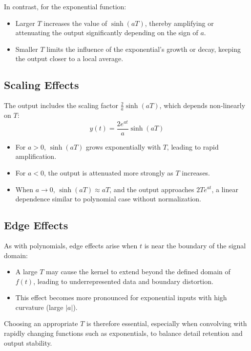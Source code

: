 \documentclass[12pt,a4paper]{report}
\begin{document}
In contrast, for the exponential function:
\begin{itemize}
    \item Larger \( T \) increases the value of \( \sinh(aT) \), thereby amplifying or attenuating the output significantly depending on the sign of \( a \).
    \item Smaller \( T \) limits the influence of the exponential's growth or decay, keeping the output closer to a local average.
\end{itemize}

\subsection{Scaling Effects}

The output includes the scaling factor \( \frac{2}{a} \sinh(aT) \), which depends non-linearly on \( T \):
\[
y(t) = \frac{2e^{at}}{a} \sinh(aT)
\]

\begin{itemize}
    \item For \( a > 0 \), \( \sinh(aT) \) grows exponentially with \( T \), leading to rapid amplification.
    \item For \( a < 0 \), the output is attenuated more strongly as \( T \) increases.
    \item When \( a \to 0 \), \( \sinh(aT) \approx aT \), and the output approaches \( 2Te^{at} \), a linear dependence similar to polynomial case without normalization.
\end{itemize}

\subsection{Edge Effects}

As with polynomials, edge effects arise when \( t \) is near the boundary of the signal domain:
\begin{itemize}
    \item A large \( T \) may cause the kernel to extend beyond the defined domain of \( f(t) \), leading to underrepresented data and boundary distortion.
    \item This effect becomes more pronounced for exponential inputs with high curvature (large \( |a| \)).
\end{itemize}


Choosing an appropriate \( T \) is therefore essential, especially when convolving with rapidly changing functions such as exponentials, to balance detail retention and output stability.
\end{document}
